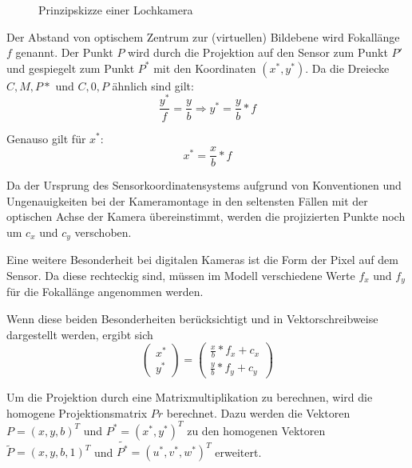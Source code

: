 \begin{figure}[htpb]
  \centering
  \def\svgwidth{\textwidth}
  
  \caption{Prinzipskizze einer Lochkamera }
  \label{fig:Lochkamera}
\end{figure}


Der Abstand von optischem Zentrum zur (virtuellen) Bildebene wird Fokallänge
$f$ genannt. Der Punkt $P$ wird durch die Projektion auf
den Sensor zum Punkt $P'$ und gespiegelt zum Punkt $P^*$ mit den Koordinaten
$(x^*,y^*)$. 
Da die Dreiecke $C,M,P*$ und $C,0,P$ ähnlich sind gilt: \begin{equation}
  \frac{y^*}{f}=\frac{y}{b} \Rightarrow y^*=\frac{y}{b}*f \end{equation}


Genauso gilt für $x^*$: \begin{equation} x^*=\frac{x}{b}*f \end{equation}

Da der Ursprung des Sensorkoordinatensystems aufgrund von Konventionen und
Ungenauigkeiten bei der Kameramontage in den seltensten Fällen mit der
optischen Achse der Kamera übereinstimmt, werden die projizierten Punkte noch um
$c_x$ und $c_y$ verschoben.

Eine weitere Besonderheit bei digitalen Kameras ist die Form der Pixel auf dem
Sensor. Da diese rechteckig sind, müssen im Modell verschiedene Werte $f_x$ und
$f_y$ für die Fokallänge angenommen werden.\cite{Bradski2008}

Wenn diese beiden Besonderheiten berücksichtigt und in
Vektorschreibweise dargestellt werden, ergibt sich \begin{equation}
  \begin{pmatrix} x^*\\y^* \end{pmatrix} = \begin{pmatrix} \frac{x}{b}*f_x+c_x
    \\ \frac{y}{b}*f_y+c_y \end{pmatrix} \end{equation}


Um die Projektion durch eine Matrixmultiplikation zu berechnen, wird die
homogene Projektionsmatrix $Pr$ berechnet. Dazu werden die Vektoren
$P=\left(x,y,b\right)^T$ und $P^*=\left(x^*,y^*\right)^T$ zu den homogenen
Vektoren $\tilde{P}=\left(x,y,b,1\right)^T$ und
$\tilde{P^*}=\left(u^*,v^*,w^*\right)^T$ erweitert.

